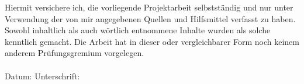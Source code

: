 
 
Hiermit versichere ich, die vorliegende Projektarbeit selbstständig und nur unter Verwendung der von mir angegebenen Quellen und Hilfsmittel verfasst zu haben. Sowohl inhaltlich als auch wörtlich entnommene Inhalte wurden als solche kenntlich gemacht. Die Arbeit hat in dieser oder vergleichbarer Form noch keinem anderem Prüfungsgremium vorgelegen. \\
\\[2em]
Datum:  \hrulefill\enspace Unterschrift: \hrulefill

\newpage